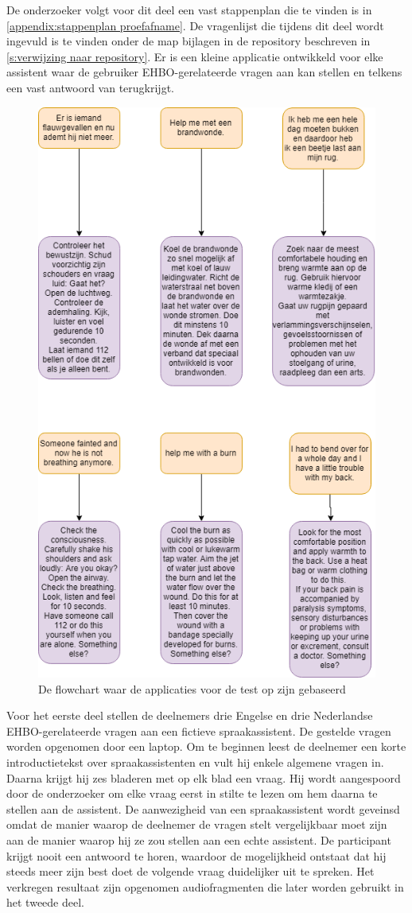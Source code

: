 De onderzoeker volgt voor dit deel een vast stappenplan die te vinden is in \ref{appendix:stappenplan proefafname}.
De vragenlijst die tijdens dit deel wordt ingevuld is te vinden onder de map bijlagen in de repository beschreven in \ref{s:verwijzing naar repository}.
Er is een kleine applicatie ontwikkeld voor elke assistent waar de gebruiker EHBO-gerelateerde vragen aan kan stellen en telkens een vast antwoord van terugkrijgt.

\begin{figure}[h]
    \includegraphics[width=0.7\linewidth]{img/flowdiagram_testapp}
    \caption{De flowchart waar de applicaties voor de test op zijn gebaseerd}
    \label{fig:flowdiagram}
\end{figure}

Voor het eerste deel stellen de deelnemers drie Engelse en drie Nederlandse EHBO-gerelateerde vragen aan een fictieve spraakassistent. De gestelde vragen worden opgenomen door een laptop.
Om te beginnen leest de deelnemer een korte introductietekst over spraakassistenten en vult hij enkele algemene vragen in. Daarna krijgt hij zes bladeren met op elk blad een vraag. Hij wordt aangespoord door de onderzoeker om elke vraag eerst in stilte te lezen om hem daarna te stellen aan de assistent. De aanwezigheid van een spraakassistent wordt geveinsd omdat de manier waarop de deelnemer de vragen stelt vergelijkbaar moet zijn aan de manier waarop hij ze zou stellen aan een echte assistent. De participant krijgt nooit een antwoord te horen, waardoor de mogelijkheid ontstaat dat hij steeds meer zijn best doet de volgende vraag duidelijker uit te spreken. Het verkregen resultaat zijn opgenomen audiofragmenten die later worden gebruikt in het tweede deel.

